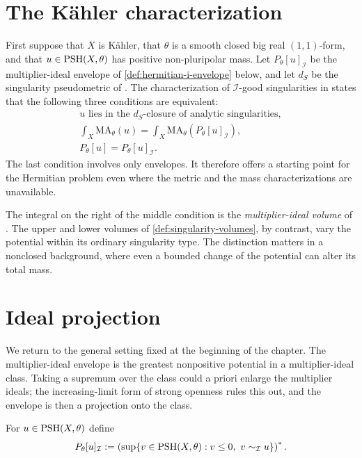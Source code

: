 \section{The K\"ahler characterization}

First suppose that $X$ is K\"ahler, that $\theta$ is a smooth closed big real $(1,1)$-form, and that $u\in\mathrm{PSH}(X,\theta)$ has positive non-pluripolar mass. Let $P_\theta[u]_{\mathcal I}$ be the multiplier-ideal envelope of \cref{def:hermitian-i-envelope} below, and let $d_S$ be the singularity pseudometric of \cite[Section~6.2]{SGPT}. The characterization of $\mathcal I$-good singularities in \cite[Theorem~7.1.1]{SGPT} states that the following three conditions are equivalent:
\[
 \begin{gathered}
 u\text{ lies in the }d_S\text{-closure of analytic singularities},\\
 \int_X\mathrm{MA}_\theta(u)
  =\int_X\mathrm{MA}_\theta(P_\theta[u]_{\mathcal I}),\\
 P_\theta[u]=P_\theta[u]_{\mathcal I}.
 \end{gathered}
\]
The last condition involves only envelopes. It therefore offers a starting point for the Hermitian problem even where the metric and the mass characterizations are unavailable.

The integral on the right of the middle condition is the \emph{multiplier-ideal volume} of \cite{SGPT}. The upper and lower volumes of \cref{def:singularity-volumes}, by contrast, vary the potential within its ordinary singularity type. The distinction matters in a nonclosed background, where even a bounded change of the potential can alter its total mass.

\section{Ideal projection}

We return to the general setting fixed at the beginning of the chapter. The multiplier-ideal envelope is the greatest nonpositive potential in a multiplier-ideal class. Taking a supremum over the class could a priori enlarge the multiplier ideals; the increasing-limit form of strong openness rules this out, and the envelope is then a projection onto the class.

\begin{definition}\label{def:hermitian-i-envelope}
For $u\in\mathrm{PSH}(X,\theta)$ define
\[
 P_\theta[u]_{\mathcal I}
 :=\left(\sup\{v\in\mathrm{PSH}(X,\theta):v\leq0,
                   \ v\sim_{\mathcal I}u\}\right)^*.
\]
\end{definition}

